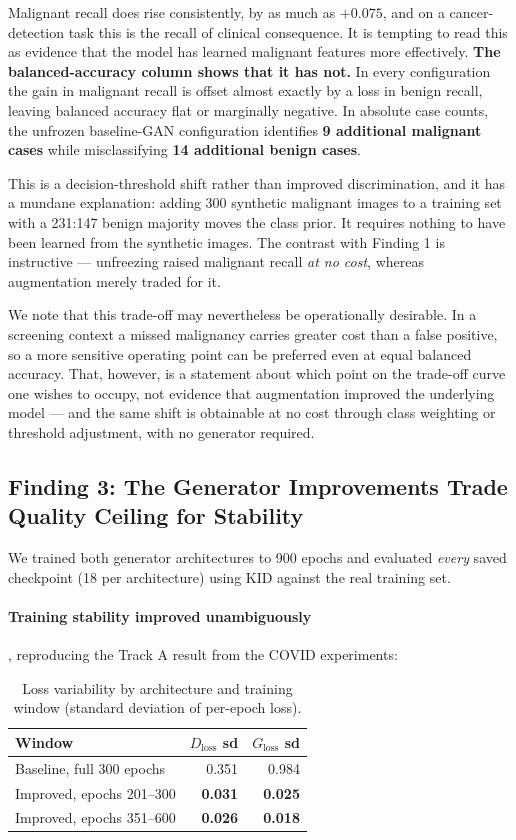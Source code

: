 Malignant recall does rise consistently, by as much as $+0.075$, and on a cancer-detection task this
is the recall of clinical consequence. It is tempting to read this as evidence that the model has
learned malignant features more effectively. \textbf{The balanced-accuracy column shows that it has
not.} In every configuration the gain in malignant recall is offset almost exactly by a loss in benign
recall, leaving balanced accuracy flat or marginally negative. In absolute case counts, the unfrozen
baseline-GAN configuration identifies \textbf{9 additional malignant cases} while misclassifying
\textbf{14 additional benign cases}.

This is a decision-threshold shift rather than improved discrimination, and it has a mundane
explanation: adding 300 synthetic malignant images to a training set with a 231:147 benign majority
moves the class prior. It requires nothing to have been learned from the synthetic images. The
contrast with Finding 1 is instructive --- unfreezing raised malignant recall \emph{at no cost},
whereas augmentation merely traded for it.

We note that this trade-off may nevertheless be operationally desirable. In a screening context a
missed malignancy carries greater cost than a false positive, so a more sensitive operating point can
be preferred even at equal balanced accuracy. That, however, is a statement about which point on the
trade-off curve one wishes to occupy, not evidence that augmentation improved the underlying model ---
and the same shift is obtainable at no cost through class weighting or threshold adjustment, with no
generator required.

\subsection{Finding 3: The Generator Improvements Trade Quality Ceiling for Stability}

We trained both generator architectures to 900 epochs and evaluated \emph{every} saved checkpoint
(18 per architecture) using KID against the real training set.

\paragraph{Training stability improved unambiguously}, reproducing the Track A result from the COVID
experiments:

\begin{table}[h]
\centering
\caption{Loss variability by architecture and training window (standard deviation of per-epoch loss).}
\label{tab:ddsm_stability}
\begin{tabular}{lrr}
\toprule
\textbf{Window} & \textbf{$D_{\text{loss}}$ sd} & \textbf{$G_{\text{loss}}$ sd} \\
\midrule
Baseline, full 300 epochs   & 0.351 & 0.984 \\
Improved, epochs 201--300   & \textbf{0.031} & \textbf{0.025} \\
Improved, epochs 351--600   & \textbf{0.026} & \textbf{0.018} \\
\bottomrule
\end{tabular}
\end{table}

